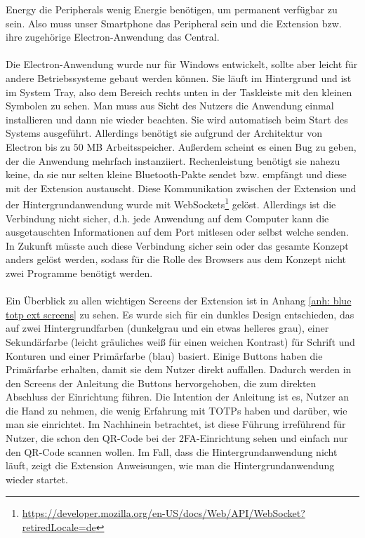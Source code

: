 Energy die Peripherals wenig Energie benötigen, um permanent verfügbar zu sein. 
Also muss unser Smartphone das Peripheral sein und die Extension bzw. ihre 
zugehörige Electron-Anwendung das Central.
\\\\
Die Electron-Anwendung wurde nur für Windows entwickelt, sollte aber leicht für 
andere Betriebssysteme gebaut werden können. Sie läuft im Hintergrund und ist im 
System Tray, also dem Bereich rechts unten in der Taskleiste mit den kleinen 
Symbolen zu sehen. Man muss aus Sicht des Nutzers die Anwendung einmal installieren 
und dann nie wieder beachten. Sie wird automatisch beim Start des Systems 
ausgeführt. Allerdings benötigt sie aufgrund der Architektur von Electron bis zu 
$50$ MB Arbeitsspeicher. Außerdem scheint es einen Bug zu geben, der die Anwendung mehrfach 
instanziiert. Rechenleistung benötigt sie nahezu keine, da sie nur selten 
kleine Bluetooth-Pakte sendet bzw. empfängt und diese mit der Extension 
austauscht. Diese Kommunikation zwischen der Extension und der Hintergrundanwendung 
wurde mit WebSockets\footnote{\href{https://developer.mozilla.org/en-US/docs/Web/API/WebSocket?retiredLocale=de}{https://developer.mozilla.org/en-US/docs/Web/API/WebSocket?retiredLocale=de}} 
gelöst. Allerdings ist die Verbindung nicht sicher, d.h. jede Anwendung auf dem 
Computer kann die ausgetauschten Informationen auf dem Port mitlesen oder selbst 
welche senden. In Zukunft müsste auch diese Verbindung sicher sein oder das gesamte 
Konzept anders gelöst werden, sodass für die Rolle des Browsers aus dem Konzept 
nicht zwei Programme benötigt werden.
\\\\
Ein Überblick zu allen wichtigen Screens der Extension ist in Anhang \ref{anh: blue totp ext screens} 
zu sehen. Es wurde sich für ein dunkles Design entschieden, das auf zwei 
Hintergrundfarben (dunkelgrau und ein etwas helleres grau), einer Sekundärfarbe 
(leicht gräuliches weiß für einen weichen Kontrast) für Schrift und Konturen und 
einer Primärfarbe (blau) basiert. Einige Buttons haben die Primärfarbe erhalten, 
damit sie dem Nutzer direkt auffallen. Dadurch werden in den Screens der Anleitung 
die Buttons hervorgehoben, die zum direkten Abschluss der Einrichtung führen. Die 
Intention der Anleitung ist es, Nutzer an die Hand zu nehmen, die wenig Erfahrung 
mit TOTPs haben und darüber, wie man sie einrichtet. Im Nachhinein betrachtet, ist 
diese Führung irreführend für Nutzer, die schon den QR-Code bei der 2FA-Einrichtung 
sehen und einfach nur den QR-Code scannen wollen. Im Fall, dass die 
Hintergrundanwendung nicht läuft, zeigt die Extension Anweisungen, wie man die 
Hintergrundanwendung wieder startet.